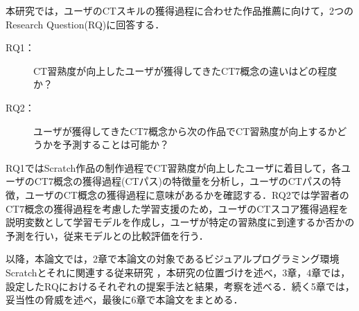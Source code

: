 \documentclass[11pt,dvipdfmx]{jreport}
\begin{document}
本研究では，ユーザのCTスキルの獲得過程に合わせた作品推薦に向けて，2つのResearch Question(RQ)に回答する．

\begin{description}
\item [RQ1：]CT習熟度が向上したユーザが獲得してきたCT7概念の違いはどの程度か？
\item [RQ2：]ユーザが獲得してきたCT7概念から次の作品でCT習熟度が向上するかどうかを予測することは可能か？
\end{description}

RQ1ではScratch作品の制作過程でCT習熟度が向上したユーザに着目して，各ユーザのCT7概念の獲得過程(CTパス)の特徴量を分析し，ユーザのCTパスの特徴，ユーザのCT概念の獲得過程に意味があるかを確認する．RQ2では学習者のCT7概念の獲得過程を考慮した学習支援のため，ユーザのCTスコア獲得過程を説明変数として学習モデルを作成し，ユーザが特定の習熟度に到達するか否かの予測を行い，従来モデルとの比較評価を行う．

以降，本論文では，2章で本論文の対象であるビジュアルプログラミング環境Scratchとそれに関連する従来研究
，本研究の位置づけを述べ，3章，4章では，設定したRQにおけるそれぞれの提案手法と結果，考察を述べる．続く5章では，妥当性の脅威を述べ，最後に6章で本論文をまとめる．


\end{document}
